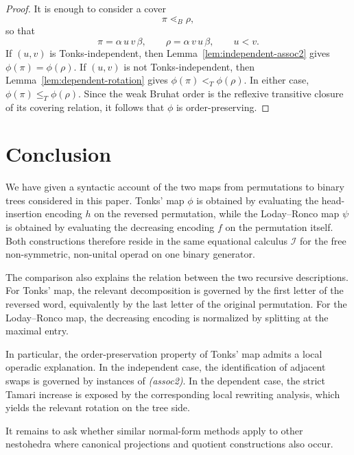 \documentclass[a4paper]{article}
\theoremstyle{plain}
\theoremstyle{definition}
\theoremstyle{remark}
\numberwithin{equation}{section}
\renewcommand{\le}{\leqslant}\renewcommand{\ge}{\geqslant}
\begin{document}
\begin{proof}
It is enough to consider a cover
\[
\pi\lessdot_B \rho,
\]
so that
\[
\pi=\alpha\,u\,v\,\beta,
\qquad
\rho=\alpha\,v\,u\,\beta,
\qquad
u<v.
\]
If \((u,v)\) is Tonks-independent, then Lemma~\ref{lem:independent-assoc2} gives $\phi(\pi)=\phi(\rho)$. If \((u,v)\) is not Tonks-independent, then Lemma~\ref{lem:dependent-rotation} gives $\phi(\pi)<_T \phi(\rho)$. In either case, $\phi(\pi)\le_T \phi(\rho)$. Since the weak Bruhat order is the reflexive transitive closure of its covering relation, it follows that \(\phi\) is order-preserving.
\end{proof}


\section{Conclusion}

We have given a syntactic account of the two maps from permutations to binary
trees considered in this paper. Tonks' map \(\phi\) is obtained by evaluating the head-insertion encoding \(h\) on the reversed permutation, while the Loday--Ronco map \(\psi\) is
obtained by evaluating the decreasing encoding \(f\) on the permutation itself. Both constructions therefore reside in the same equational calculus
\(\mathcal I\) for the free non-symmetric, non-unital operad on one binary
generator.

The comparison also explains the relation between the two recursive descriptions.
For Tonks' map, the relevant decomposition is governed by the first letter of
the reversed word, equivalently by the last letter of the original permutation.
For the Loday--Ronco map, the decreasing encoding is normalized by splitting at
the maximal entry.

In particular, the order-preservation property of Tonks' map admits a local
operadic explanation. In the independent case, the identification of adjacent
swaps is governed by instances of \emph{(assoc2)}. In the dependent case, the
strict Tamari increase is exposed by the corresponding local rewriting analysis,
which yields the relevant rotation on the tree side.

It remains to ask whether similar normal-form methods apply to other nestohedra where canonical
projections and quotient constructions also occur.
\end{document}
